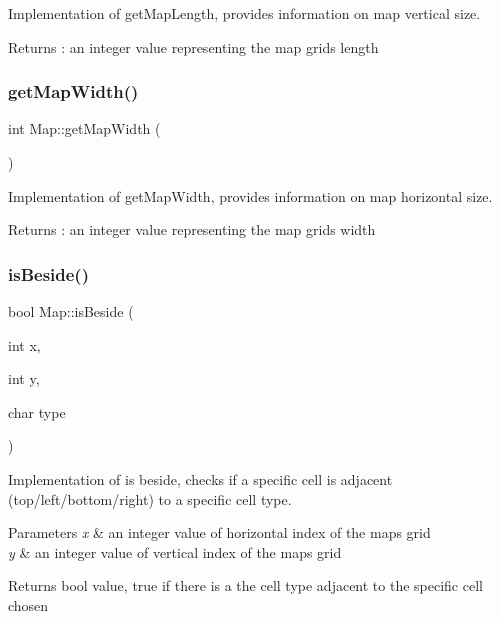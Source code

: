 Implementation of get\+Map\+Length, provides information on map vertical size. \begin{DoxyReturn}{Returns}
\+: an integer value representing the map grid\textquotesingle{}s length 
\end{DoxyReturn}
\hypertarget{class_map_a286853d8475bc1bbede582c89e9b1491}{}\label{class_map_a286853d8475bc1bbede582c89e9b1491} 
\subsubsection{\texorpdfstring{get\+Map\+Width()}{getMapWidth()}}
{\footnotesize\ttfamily int Map\+::get\+Map\+Width (\begin{DoxyParamCaption}{ }\end{DoxyParamCaption})}

Implementation of get\+Map\+Width, provides information on map horizontal size. \begin{DoxyReturn}{Returns}
\+: an integer value representing the map grid\textquotesingle{}s width 
\end{DoxyReturn}
\hypertarget{class_map_a7ba2837b589493924b726dc326d68e8e}{}\label{class_map_a7ba2837b589493924b726dc326d68e8e} 
\subsubsection{\texorpdfstring{is\+Beside()}{isBeside()}}
{\footnotesize\ttfamily bool Map\+::is\+Beside (\begin{DoxyParamCaption}\item[{int}]{x,  }\item[{int}]{y,  }\item[{char}]{type }\end{DoxyParamCaption})}

Implementation of is beside, checks if a specific cell is adjacent (top/left/bottom/right) to a specific cell type. 
\begin{DoxyParams}{Parameters}
{\em x} & an integer value of horizontal index of the map\textquotesingle{}s grid \\
\hline
{\em y} & an integer value of vertical index of the map\textquotesingle{}s grid \\
\hline
\end{DoxyParams}
\begin{DoxyReturn}{Returns}
bool value, true if there is a the cell type adjacent to the specific cell chosen 
\end{DoxyReturn}
\hypertarget{class_map_a79e5ced99d160ca9b680661169f16d84}{}\label{class_map_a79e5ced99d160ca9b680661169f16d84} 
